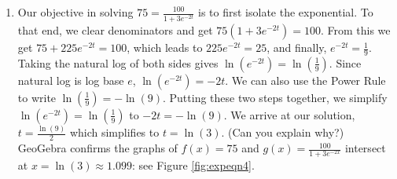 {\begin{enumerate}
\[ \begin{array}{rclr}
(x+2) \ln(3) & = & 2x \ln(7) & \\

x \ln(3) + 2 \ln(3) & = & 2x \ln(7) & \\
2 \ln(3) & = & 2x \ln(7) - x \ln(3) & \\
2 \ln(3) & = & x (2 \ln(7) - \ln(3)) & \mbox{Factor.}\\
x & = & \frac{2 \ln(3)}{2\ln(7) - \ln(3)} & \\ [4pt]
\end{array}\]

Graphing $f(x) = 9 \cdot 3^{x}$ and $g(x) = 7^{2x}$ in GeoGebra, we see that these two graphs intersect at $x = \frac{2 \ln(3)}{2\ln(7) - \ln(3)}  \approx 0.7866$: see Figure \ref{fig:expeqn3}.

{}

\item  Our objective in solving  $75 = \frac{100}{1 + 3e^{-2t}}$ is to first isolate the exponential.  To that end, we clear denominators and get $75\left(1 + 3e^{-2t}\right) = 100$. From this we get $75 + 225e^{-2t} =100$, which leads to  $225e^{-2t} = 25$, and finally, $e^{-2t} = \frac{1}{9}$.    Taking the natural log of both sides gives $\ln\left(e^{-2t}\right) = \ln\left( \frac{1}{9} \right)$.  Since natural log is log base $e$, $\ln\left(e^{-2t}\right) = -2t$.  We can also use the Power Rule to write $\ln\left( \frac{1}{9} \right) = -\ln(9)$.  Putting these two steps together, we simplify $\ln\left(e^{-2t}\right) = \ln\left( \frac{1}{9} \right)$ to   $-2t = -\ln(9)$.  We arrive at our solution, $t = \frac{\ln(9)}{2}$ which simplifies to $t = \ln(3)$. (Can you explain why?)  GeoGebra confirms the graphs of $f(x) = 75$ and $g(x) = \frac{100}{1 + 3e^{-2x}}$ intersect at $x = \ln(3) \approx 1.099$: see Figure \ref{fig:expeqn4}.

{}




\end{enumerate}}
